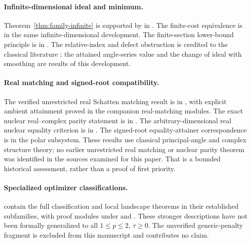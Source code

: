 \paragraph{Infinite-dimensional ideal and minimum.}
Theorem~\ref{thm:family-infinite} is supported by
in
.
The finite-cost equivalence is
in the same infinite-dimensional development.  The finite-section
lower-bound principle is
in
.
The relative-index and defect obstruction is credited to the classical
literature \citep{avron1994index}; the attained angle-series value and
the change of ideal with smoothing are results of this development.

\paragraph{Real matching and signed-root compatibility.}
The verified unrestricted real Schatten matching result is
in
,
with explicit ambient attainment proved in the companion real-matching
modules.  The exact nuclear real--complex parity statement is
in
.
The arbitrary-dimensional real nuclear equality criterion is
in
.
The signed-root equality-attainer correspondence is
 in the polar
subsystem.  These results use classical principal-angle and complex
structure theory; no earlier unrestricted real matching or nuclear
parity theorem was identified in the sources examined for this paper.
That is a bounded historical assessment, rather than a proof of first
priority.

\paragraph{Specialized optimizer classifications.}
 contain the
full classification and local landscape theorems in their established
subfamilies, with proof modules under
 and
.
These stronger descriptions have not been formally generalized to
all $1\le p\le2$, $\tau\ge0$.  The unverified generic-penalty
fragment 
is excluded from this manuscript and contributes no claim.

